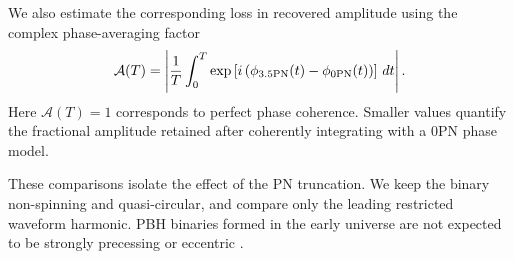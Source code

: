 \documentclass[aps,prd,amsmath,floats,floatfix, twocolumn,
superscriptaddress,nofootinbib,showpacs]{revtex4-2}
\begin{document}
We also estimate the corresponding loss in recovered amplitude using the complex phase-averaging factor
\begin{equation}
    \mathcal{A}(T)
    =
    \left|
    \frac{1}{T}
    \int_0^T
    \exp\left[
        i\left(\phi_{\rm 3.5PN}(t)-\phi_{\rm 0PN}(t)\right)
    \right]
    \, dt
    \right| .
    \label{eq:amplitude_penalty}
\end{equation}
Here $\mathcal{A}(T)=1$ corresponds to perfect phase coherence.  Smaller values quantify the fractional amplitude retained after coherently integrating with a 0PN phase model.

These comparisons isolate the effect of the PN truncation.  We keep the binary non-spinning and quasi-circular, and compare only the leading restricted waveform harmonic.  PBH binaries formed in the early universe are not expected to be strongly precessing or eccentric \cite{Peters:1964zz, DeLuca:2020bjf}.



\def\bibsection{\section*{References}}


\end{document}
